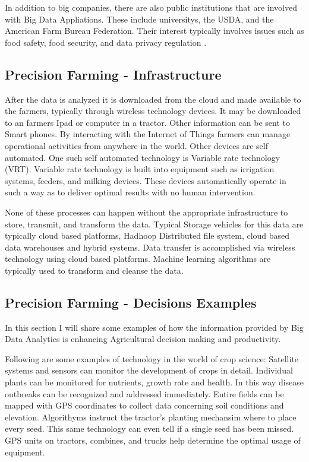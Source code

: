 \documentclass[sigconf]{acmart}
\begin{document}
In addition to big companies, there are also public institutions that are involved with Big Data Appliations. These include universitys, the USDA, and the American Farm Bureau Federation. Their interest typically involves issues such as food safety, food security, and data privacy regulation \cite {article}. 

\subsection{Precision Farming - Infrastructure}

After the data is analyzed it is downloaded from the cloud and made available to the farmers, typically through wireless technology devices. It may be downloaded to an farmers Ipad or computer in a tractor. Other information can be sent to Smart phones. By interacting with the Internet of Things farmers can manage operational activities from anywhere in the world. Other devices are self automated. One such self automated technology is Variable rate technology (VRT). Variable rate technology is built into equipment such as irrigation systems, feeders, and milking devices. These devices automatically operate in such a way as to deliver optimal results with no human intervention.

None of these processes can happen without the appropriate infrastructure to store, transmit, and transform the data. Typical Storage vehicles for this data are typically cloud based platforms, Hadhoop Distributed file system, cloud based data warehouses and hybrid systems. Data transfer is accomplished via wireless technology using cloud based platforms. Machine learning algorithms are typically used to transform and cleanse the data. \cite {article}

\subsection {Precision Farming - Decisions Examples}

In this section I will share some examples of how the information provided by Big Data Analytics is enhancing Agricultural decision making and productivity.

Following are some examples of technology in the world of crop science: Satellite systems and sensors can monitor the development of crops in detail. Individual plants can be monitored for nutrients, growth rate and health. In this way disease outbreaks can be recognized and addressed immediately.  Entire fields can be mapped with GPS coordinates to collect data concerning soil conditions and elevation. Algorithyms instruct the tractor's planting mechansim where to place every seed. This same technology can even tell if a single seed has been missed. GPS units on tractors, combines, and trucks help determine the optimal usage of equipment.
\end{document}

